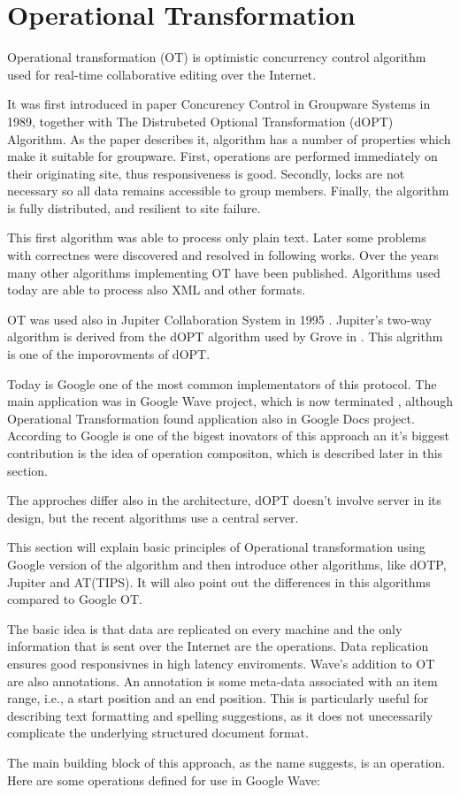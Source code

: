 \documentclass[12pt,oneside]{fithesis2}
\begin{document}
\section{Operational Transformation}
\par Operational transformation (OT) is optimistic concurrency control algorithm used for real-time collaborative editing over the Internet. 
\par It was first introduced in paper Concurency Control in Groupware Systems\cite{Ellis} in 1989, together with The Distrubeted Optional Transformation (dOPT) Algorithm. As the paper describes it, algorithm has a number of properties which make it suitable for groupware. First, operations are performed immediately on their originating site, thus responsiveness is good. Secondly, locks are not necessary so all data remains accessible to group members. Finally, the algorithm is fully distributed, and resilient to site failure. \par This first algorithm was able to process only plain text. Later some problems with correctnes were discovered and resolved in following works. Over the years many other algorithms implementing OT have been published. Algorithms used today are able to process also XML and other formats. \par OT was used also in Jupiter Collaboration System in 1995 \cite{Jupiter}. Jupiter's two-way algorithm is derived from the dOPT algorithm used by Grove in \cite{Ellis}. This algrithm is one of the imporovments of dOPT. \par Today is Google one of the most common implementators of this protocol. The main application was in Google Wave project, which is now terminated , although Operational Transformation found application also in Google Docs project. According to \cite{Spiewak} Google is one of the bigest inovators of this approach an it's biggest contribution is the idea of operation compositon, which is described later in this section. \par The approches differ also in the architecture, dOPT doesn't involve server in its design, but the recent algorithms use a central server.
\par This section will explain basic principles of Operational transformation using Google version of the algorithm and then introduce other algorithms, like dOTP, Jupiter and AT(TIPS). It will also point out the differences in this algorithms compared to Google OT. 
\par The basic idea is that data are replicated on every machine and the only information that is sent over the Internet are the operations. Data replication ensures good responsivnes in high latency enviroments. Wave's addition to OT are also annotations. An annotation is some meta-data associated with an item range, i.e., a start position and an end position. This is particularly useful for describing text formatting and spelling suggestions, as it does not unecessarily complicate the underlying structured document format.\cite{Google} \par The main building block of this approach, as the name suggests, is an operation. Here are some operations defined for use in Google Wave\cite{Google}:
\end{document}
